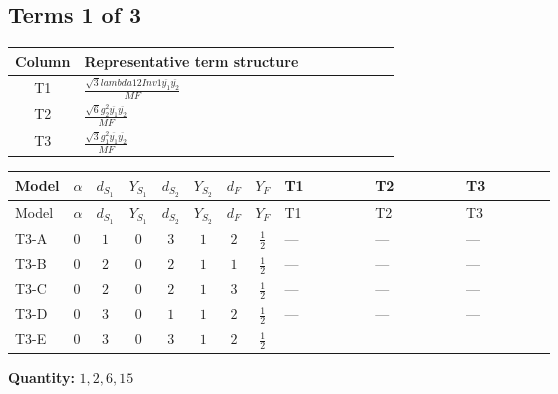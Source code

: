 \documentclass[8pt]{article}
\begin{document}
\begin{landscape}
\subsection*{Terms 1 of 3}
\begin{center}
\begin{tabular}{@{}c >{\raggedright\arraybackslash}p{0.82\linewidth}@{}}
\toprule
Column & Representative term structure \\
\midrule
T1 & \(\displaystyle \frac{\sqrt{3} lambda12Inv1 \overline{y_{1}} \overline{y_{2}}}{MF}\) \\
\midrule
T2 & \(\displaystyle \frac{\sqrt{6} g_{2}^{2} \overline{y_{1}} \overline{y_{2}}}{MF}\) \\
\midrule
T3 & \(\displaystyle \frac{\sqrt{3} g_{1}^{2} \overline{y_{1}} \overline{y_{2}}}{MF}\) \\
\midrule
\bottomrule
\end{tabular}
\end{center}
\smallskip
\tiny
\begin{longtable}{@{}llcccccc >{\raggedright\arraybackslash}p{0.21\linewidth} >{\raggedright\arraybackslash}p{0.21\linewidth} >{\raggedright\arraybackslash}p{0.21\linewidth}@{}}
\toprule
Model & $\alpha$ & $d_{S_1}$ & $Y_{S_1}$ & $d_{S_2}$ & $Y_{S_2}$ & $d_F$ & $Y_F$ & T1 & T2 & T3 \\
\midrule
\endfirsthead
\toprule
Model & $\alpha$ & $d_{S_1}$ & $Y_{S_1}$ & $d_{S_2}$ & $Y_{S_2}$ & $d_F$ & $Y_F$ & T1 & T2 & T3 \\
\midrule
\endhead
T3-A & $0$ & $1$ & $0$ & $3$ & $1$ & $2$ & $\frac{1}{2}$ & --- & --- & --- \\
\midrule
T3-B & $0$ & $2$ & $0$ & $2$ & $1$ & $1$ & $\frac{1}{2}$ & --- & --- & --- \\
\midrule
T3-C & $0$ & $2$ & $0$ & $2$ & $1$ & $3$ & $\frac{1}{2}$ & --- & --- & --- \\
\midrule
T3-D & $0$ & $3$ & $0$ & $1$ & $1$ & $2$ & $\frac{1}{2}$ & --- & --- & --- \\
\midrule
T3-E & $0$ & $3$ & $0$ & $3$ & $1$ & $2$ & $\frac{1}{2}$ & \scriptsize\adjustbox{max width=\linewidth}{$\begin{gathered} - \frac{\sqrt{3} lambda12Inv1 \overline{y_{1}} \overline{y_{2}}}{6 MF}\end{gathered}$} & \scriptsize\adjustbox{max width=\linewidth}{$\begin{gathered} \frac{\sqrt{6} g_{2}^{2} \overline{y_{1}} \overline{y_{2}}}{6 MF}\end{gathered}$} & \scriptsize\adjustbox{max width=\linewidth}{$\begin{gathered} \frac{\sqrt{3} g_{1}^{2} \overline{y_{1}} \overline{y_{2}}}{8 MF}\end{gathered}$} \\
\midrule
\bottomrule
\end{longtable}
\clearpage
\noindent\textbf{Quantity: }$\mathrm{1,2,6,15}$\par\smallskip

\end{landscape}
\end{document}
